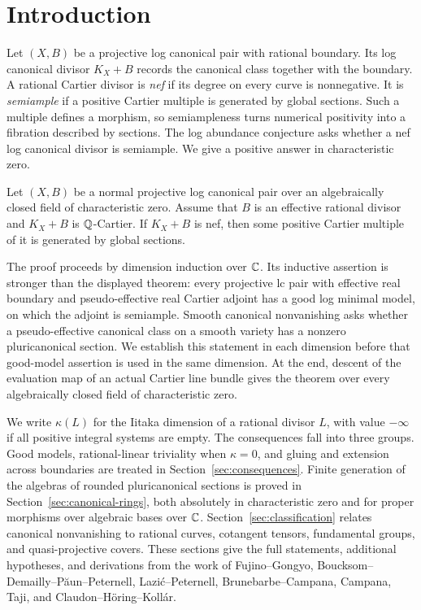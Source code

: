 \section{Introduction}\label{sec:introduction}
Let $(X,B)$ be a projective log canonical pair with rational boundary.
Its log canonical divisor $K_X+B$ records the canonical class together
with the boundary. A rational Cartier divisor is \emph{nef} if its degree
on every curve is nonnegative. It is \emph{semiample} if a positive Cartier
multiple is generated by global sections. Such a multiple defines a morphism,
so semiampleness turns numerical positivity into a fibration described by
sections. The log abundance conjecture asks whether a nef log canonical
divisor is semiample. We give a positive answer in characteristic zero.

\begin{theorem}\label{thm:main}
Let $(X,B)$ be a normal projective log canonical pair over an algebraically
closed field of characteristic zero. Assume that $B$ is an effective rational
divisor and $K_X+B$ is $\mathbb{Q}$-Cartier. If $K_X+B$ is nef, then some positive
Cartier multiple of it is generated by global sections.
\end{theorem}

The proof proceeds by dimension induction over $\mathbb{C}$. Its inductive assertion
is stronger than the displayed theorem: every projective lc pair with effective
real boundary and pseudo-effective real Cartier adjoint has a good log minimal
model, on which the adjoint is semiample. Smooth canonical nonvanishing asks whether a pseudo-effective canonical
class on a smooth variety has a nonzero pluricanonical section. We
establish this statement in each dimension before
that good-model assertion is used in the same dimension. At the end, descent
of the evaluation map of an actual Cartier line bundle gives the theorem over
every algebraically closed field of characteristic zero.

We write $\kappa(L)$ for the Iitaka dimension of a rational divisor $L$,
with value $-\infty$ if all positive integral systems are empty.
The consequences fall into three groups. Good models, rational-linear
triviality when $\kappa=0$, and gluing and extension across boundaries are
treated in Section~\ref{sec:consequences}. Finite generation of the algebras
of rounded pluricanonical sections is proved in
Section~\ref{sec:canonical-rings}, both absolutely in characteristic zero
and for proper morphisms over algebraic bases over $\mathbb{C}$.
Section~\ref{sec:classification} relates canonical nonvanishing to rational
curves, cotangent tensors, fundamental groups, and quasi-projective covers.
These sections give the full statements, additional hypotheses, and
derivations from the work of Fujino--Gongyo, Boucksom--Demailly--P{\u a}un--Peternell,
Lazi{\'c}--Peternell, Brunebarbe--Campana, Campana, Taji, and
Claudon--H\"oring--Koll\'ar.

